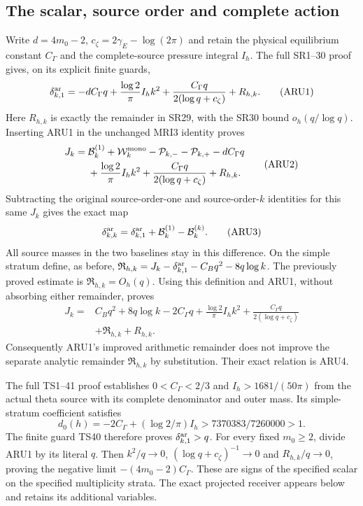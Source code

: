 \subsection{The scalar, source order and complete action}
Write $d=4m_0-2$, $c_\zeta=2\gamma_E-\log(2\pi)$ and retain the physical
equilibrium constant $C_\Gamma$ and the complete-source pressure integral
$I_h$. The full SR1--30 proof gives, on its explicit finite guards,
\[
 \delta_{k,1}^{\rm ar}=-dC_\Gamma q+
 \frac{\log2}{\pi}I_hk^2+
 \frac{C_\Gamma q}{2(\log q+c_\zeta)}+R_{h,k}.
 \tag{ARU1}
\]
Here $R_{h,k}$ is exactly the remainder in SR29, with the SR30 bound
$o_h(q/\log q)$. Inserting ARU1 in the unchanged MRI3 identity proves
\[
\begin{split}
 J_k={}&\mathcal B_k^{(1)}+\mathcal W_k^{\rm mono}
 -\mathcal P_{k,-}-\mathcal P_{k,+}-dC_\Gamma q\\
 &+\frac{\log2}{\pi}I_hk^2+
 \frac{C_\Gamma q}{2(\log q+c_\zeta)}+R_{h,k}.
\end{split}\tag{ARU2}
\]
Subtracting the original source-order-one and source-order-$k$ identities
for this same $J_k$ gives the exact map
\[
 \delta_{k,k}^{\rm ar}=\delta_{k,1}^{\rm ar}
                   +\mathcal B_k^{(1)}-\mathcal B_k^{(k)}.
 \tag{ARU3}
\]
All source masses in the two baselines stay in this difference. On the
simple stratum define, as before,
$\mathfrak R_{h,k}=J_k-\delta_{k,1}^{\rm ar}-C_Bq^2-8q\log k$.
The previously proved estimate is $\mathfrak R_{h,k}=O_h(q)$.
Using this definition and ARU1, without absorbing either remainder,
proves
\[
\begin{split}
 J_k={}&C_Bq^2+8q\log k-2C_\Gamma q+
 \frac{\log2}{\pi}I_hk^2+
 \frac{C_\Gamma q}{2(\log q+c_\zeta)}\\
 &+\mathfrak R_{h,k}+R_{h,k}.
\end{split}\tag{ARU4}
\]
Consequently ARU1's improved arithmetic remainder does not improve
the separate analytic remainder $\mathfrak R_{h,k}$ by substitution.
Their exact relation is ARU4.

The full TS1--41 proof establishes $0<C_\Gamma<2/3$ and
$I_h>1681/(50\pi)$ from the actual theta source with its complete
denominator and outer mass. Its simple-stratum coefficient satisfies
\[
 d_0(h)=-2C_\Gamma+(\log2/\pi)I_h
       >7370383/7260000>1.
 \tag{ARU5}
\]
The finite guard TS40 therefore proves $\delta_{k,1}^{\rm ar}>q$.
For every fixed $m_0\ge2$, divide ARU1 by its literal $q$.
Then $k^2/q\to0$, $(\log q+c_\zeta)^{-1}\to0$ and
$R_{h,k}/q\to0$, proving the negative limit
$-(4m_0-2)C_\Gamma$. These are signs of the specified scalar on the
specified multiplicity strata. The exact projected receiver appears
below and retains its additional variables.

